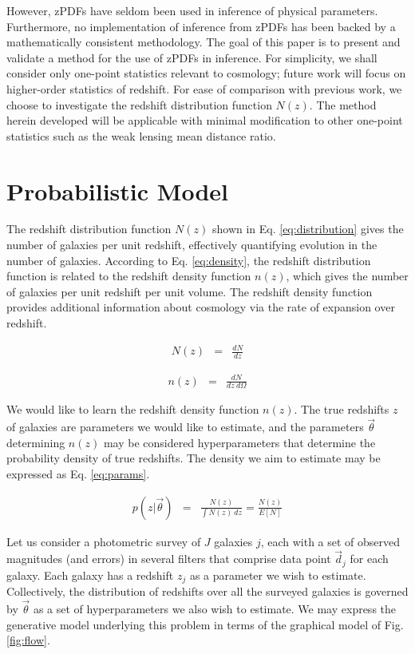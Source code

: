 \documentclass[12pt, onecolumn]{emulateapj}
\begin{document}
However, zPDFs have seldom been used in inference of physical parameters.  Furthermore, no implementation of inference from zPDFs has been backed by a mathematically consistent methodology.  The goal of this paper is to present and validate a method for the use of zPDFs in inference.  For simplicity, we shall consider only one-point statistics relevant to cosmology; future work will focus on higher-order statistics of redshift.  For ease of comparison with previous work, we choose to investigate the redshift distribution function $N(z)$.  The method herein developed will be applicable with minimal modification to other one-point statistics such as the weak lensing mean distance ratio.

\section{Probabilistic Model}

The redshift distribution function $N(z)$ shown in Eq. \ref{eq:distribution} gives the number of galaxies per unit redshift, effectively quantifying evolution in the number of galaxies.  \citep{men13}  According to Eq. \ref{eq:density}, the redshift distribution function is related to the redshift density function $n(z)$, which gives the number of galaxies per unit redshift per unit volume.  The redshift density function provides additional information about cosmology via the rate of expansion over redshift.

\begin{eqnarray}
\label{eq:distribution}
N(z) &=& \frac{dN}{dz}
\end{eqnarray}

\begin{eqnarray}
\label{eq:density}
n(z) &=& \frac{dN}{dz\ d\Omega}
\end{eqnarray}

We would like to learn the redshift density function $n(z)$.  The true redshifts $z$ of galaxies are parameters we would like to estimate, and the parameters $\vec{\theta}$ determining $n(z)$ may be considered hyperparameters that determine the probability density of true redshifts.  The density we aim to estimate may be expressed as Eq. \ref{eq:params}.

\begin{eqnarray}
\label{eq:params}
p(z|\vec{\theta}) &=& \frac{N(z)}{\int N(z)\ dz} = \frac{N(z)}{E[N]}
\end{eqnarray}

Let us consider a photometric survey of $J$ galaxies $j$, each with a set of observed magnitudes (and errors) in several filters that comprise data point $\vec{d}_{j}$ for each galaxy.  Each galaxy has a redshift $z_{j}$ as a parameter we wish to estimate.  Collectively, the distribution of redshifts over all the surveyed galaxies is governed by $\vec{\theta}$ as a set of hyperparameters we also wish to estimate.  We may express the generative model underlying this problem in terms of the graphical model of Fig. \ref{fig:flow}.
\end{document}
